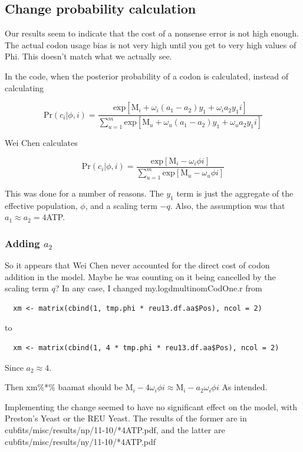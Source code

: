\subsection{Change probability calculation}

Our results seem to indicate that the cost of a nonsense error is not high enough. The actual codon usage bias is not very high until you get to very high values of Phi. This doesn't match what we actually see.

In the code, when the posterior probability of a codon is calculated, instead of calculating

\[
\mbox{Pr}(c_i|\phi,i)
=
\frac{
\mbox{exp}[\mbox{M}_i
+ \omega_i(a_1-a_2)y_1
+ \omega_ia_2y_1 i
]
}{
\sum_{u=1}^m
\mbox{exp}[\mbox{M}_u
+ \omega_u(a_1-a_2)y_1
+ \omega_ua_2y_1 i
]
}
\]

Wei Chen calculates

\[
\mbox{Pr}(c_i|\phi,i)
=
\frac{
\mbox{exp}[\mbox{M}_i
- \omega_i\phi i
]
}{
\sum_{u=1}^m
\mbox{exp}[\mbox{M}_u
- \omega_u\phi i
]
}
\]

This was done for a number of reasons. The $y_1$ term is just the aggregate of the effective population, $\phi$, and a scaling term $-q$. Also, the assumption was that $a_1 \approx a_2 = 4$ATP.

\subsubsection{Adding $a_2$}

So it appears that Wei Chen never accounted for the direct cost of codon addition in the model. Maybe he was counting on it being cancelled by the scaling term $q$? In any case, I changed my.logdmultinomCodOne.r from
\begin{verbatim}
  xm <- matrix(cbind(1, tmp.phi * reu13.df.aa$Pos), ncol = 2)
\end{verbatim}

to

\begin{verbatim}
  xm <- matrix(cbind(1, 4 * tmp.phi * reu13.df.aa$Pos), ncol = 2)
\end{verbatim}

Since $a_2\approx4$.

Then xm\%*\% baamat should be
$
\mbox{M}_i- 4\omega_i\phi i
\approx
\mbox{M}_i- a_2\omega_i\phi i
$
As intended.


Implementing the change seemed to have no significant effect on the model, with Preston's Yeast or the REU Yeast. The results of the former are in cubfits/misc/results/np/11-10/*4ATP.pdf, and the latter are cubfits/misc/results/ny/11-10/*4ATP.pdf

